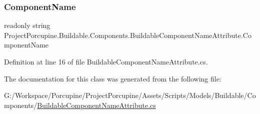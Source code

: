 \subsubsection{\texorpdfstring{Component\+Name}{ComponentName}}
{\footnotesize\ttfamily readonly string Project\+Porcupine.\+Buildable.\+Components.\+Buildable\+Component\+Name\+Attribute.\+Component\+Name}



Definition at line 16 of file Buildable\+Component\+Name\+Attribute.\+cs.



The documentation for this class was generated from the following file\+:\begin{DoxyCompactItemize}
\item 
G\+:/\+Workspace/\+Porcupine/\+Project\+Porcupine/\+Assets/\+Scripts/\+Models/\+Buildable/\+Components/\hyperlink{_buildable_component_name_attribute_8cs}{Buildable\+Component\+Name\+Attribute.\+cs}\end{DoxyCompactItemize}
